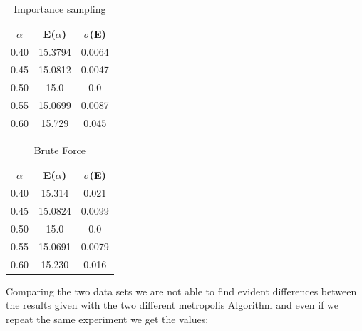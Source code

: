 \documentclass[10pt,a4paper,titlepage]{article}
\begin{document}
\begin{minipage}[b]{0.5\textwidth}\centering
\begin{table}[H]
\caption{{\footnotesize Importance sampling }}
\begin{center}

\begin{tabular}[t]{c c c}
\hline
$\alpha$ & E($\alpha$) & $\sigma $(E) \\\hline 
0.40&15.3794& 0.0064\\ 
0.45& 15.0812& 0.0047 \\
0.50& 15.0& 0.0\\ 
0.55& 15.0699& 0.0087\\ 
0.60& 15.729& 0.045 \\
\hline
\end{tabular}
\end{center}
\end{table}
\end{minipage}
\begin{minipage}[b]{0.5\linewidth}\centering
\begin{table}[H]
\caption{{\footnotesize Brute Force }}
\begin{center}
\begin{tabular}[t]{c c c}
\hline
$\alpha$ & E($\alpha$) & $\sigma $(E) \\\hline
0.40 &15.314 &0.021\\ 
0.45 &15.0824 &0.0099 \\
0.50 &15.0 &0.0\\ 
0.55 &15.0691 &0.0079\\ 
0.60 &15.230 &0.016 \\
\hline
\end{tabular}
\end{center}
\end{table}
\end{minipage}
Comparing the two data sets we are not able to find evident differences between the results given with the two different metropolis Algorithm and even if we repeat the same experiment we get the values:
\end{document}

